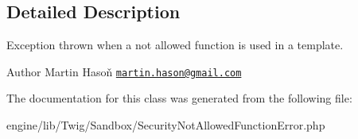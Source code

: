 \subsection{Detailed Description}
Exception thrown when a not allowed function is used in a template.

\begin{DoxyAuthor}{Author}
Martin Hasoň \href{mailto:martin.hason@gmail.com}{\tt martin.\+hason@gmail.\+com} 
\end{DoxyAuthor}


The documentation for this class was generated from the following file\+:\begin{DoxyCompactItemize}
\item 
engine/lib/\+Twig/\+Sandbox/Security\+Not\+Allowed\+Function\+Error.\+php\end{DoxyCompactItemize}
